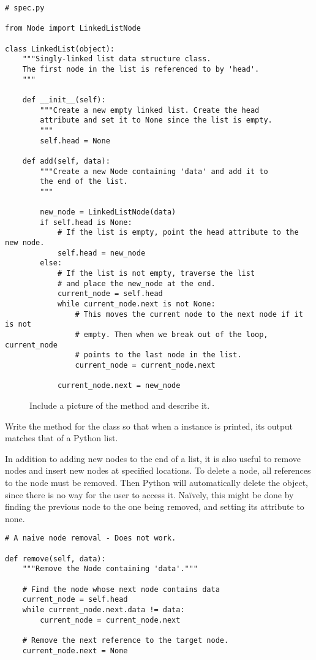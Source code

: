 \begin{lstlisting}
# spec.py

from Node import LinkedListNode

class LinkedList(object):
	"""Singly-linked list data structure class.
	The first node in the list is referenced to by 'head'.
	"""
	
	def __init__(self):
		"""Create a new empty linked list. Create the head
		attribute and set it to None since the list is empty.
		"""
		self.head = None

	def add(self, data):
		"""Create a new Node containing 'data' and add it to
		the end of the list.
		"""

		new_node = LinkedListNode(data)
		if self.head is None:
			# If the list is empty, point the head attribute to the new node.
			self.head = new_node
		else:
			# If the list is not empty, traverse the list
			# and place the new_node at the end.
			current_node = self.head
			while current_node.next is not None:
				# This moves the current node to the next node if it is not
				# empty. Then when we break out of the loop, current_node
				# points to the last node in the list.
				current_node = current_node.next

			current_node.next = new_node
\end{lstlisting}

\begin{figure}
\centering
\caption{Include a picture of the  method and describe it.}
\label{fig:add}
\end{figure}

\begin{problem}
Write the  method for the  class so that when a  instance is printed, its output matches that of a Python list.
\end{problem}

In addition to adding new nodes to the end of a list, it is also useful to remove nodes and insert new nodes at specified locations.
To delete a node, all references to the node must be removed.
Then Python will automatically delete the object, since there is no way for the user to access it.
Na{\"i}vely, this might be done by finding the previous node to the one being removed, and setting its  attribute to none.

\begin{lstlisting}
# A naive node removal - Does not work.

def remove(self, data):
	"""Remove the Node containing 'data'."""

	# Find the node whose next node contains data
	current_node = self.head
	while current_node.next.data != data:
		current_node = current_node.next

	# Remove the next reference to the target node.
	current_node.next = None
\end{lstlisting}

